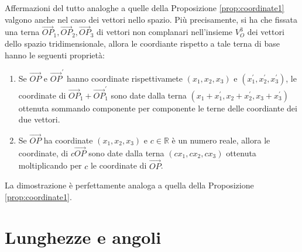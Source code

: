 \begin{oss}
  \label{oss:coordinate2}
  Affermazioni del tutto analoghe a quelle della Proposizione \ref{prop:coordinate1} valgono anche nel caso dei vettori nello spazio. Più precisamente, si ha che fissata una terna $\vec{OP}_1, \vec{OP}_2,\vec{OP}_3$ di vettori non complanari nell'insieme $V_O^3$ dei vettori dello spazio tridimensionale, allora le coordiante rispetto a tale terna di base hanno le seguenti proprietà:
  \begin{enumerate}
  \item Se $\vec{OP}$ e $\vec{OP}^\prime$ hanno coordinate rispettivamete $(x_1,x_2,x_3)$ e $(x_1^\prime,x_2^\prime,x_3^\prime)$, le coordinate di $\vec{OP}_1+\vec{OP}_1^\prime$ sono date dalla terna $(x_1+x_1^\prime,x_2+x_2^\prime,x_3+x_3^\prime)$ ottenuta sommando componente per componente le terne delle coordiante dei due vettori.
  \item Se $\vec{OP}$ ha coordinate $(x_1,x_2,x_3)$ e $c\in \mathds{R}$ è un numero reale, allora le coordinate, di $c\vec{OP}$ sono date dalla terna $(cx_1,cx_2,cx_3)$ ottenuta moltiplicando per $c$ le coordinate di $\vec{OP}$.
  \end{enumerate}
  La dimostrazione è perfettamente analoga a quella della Proposizione \ref{prop:coordinate1}.
\end{oss}
\section{Lunghezze e angoli}
\label{sec:lungeang}

